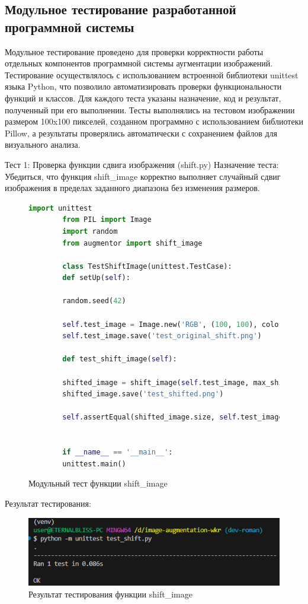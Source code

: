 \subsection{Модульное тестирование разработанной программной системы}

Модульное тестирование проведено для проверки корректности работы отдельных компонентов программной системы аугментации изображений. Тестирование осуществлялось с использованием встроенной библиотеки unittest языка Python, что позволило автоматизировать проверки функциональности функций и классов. Для каждого теста указаны назначение, код и результат, полученный при его выполнении. Тесты выполнялись на тестовом изображении размером 100x100 пикселей, созданном программно с использованием библиотеки Pillow, а результаты проверялись автоматически с сохранением файлов для визуального анализа.


Тест 1: Проверка функции сдвига изображения (shift.py)
Назначение теста: Убедиться, что функция shift\_image корректно выполняет случайный сдвиг изображения в пределах заданного диапазона без изменения размеров.

\begin{figure}[H]
	\begin{lstlisting}[language=Python]
		import unittest
		from PIL import Image
		import random
		from augmentor import shift_image
		
		class TestShiftImage(unittest.TestCase):
		def setUp(self):
		
		random.seed(42)
		
		self.test_image = Image.new('RGB', (100, 100), color='white')
		self.test_image.save('test_original_shift.png')
		
		def test_shift_image(self):
		
		shifted_image = shift_image(self.test_image, max_shift=0.1)
		shifted_image.save('test_shifted.png')
		
		self.assertEqual(shifted_image.size, self.test_image.size, "Размеры изображения изменились после сдвига.")
		
		
		if __name__ == '__main__':
		unittest.main()
	\end{lstlisting}  
	\caption{Модульный тест функции shift\_image}
	\label{model_test:test1}
\end{figure}

Результат тестирования:
\begin{figure}[H]
	\centering
	\includegraphics[width=0.7\linewidth]{images/resulttest1}
	\caption{Результат тестирования функции shift\_image}
	\label{fig:resulttest1}
\end{figure}

